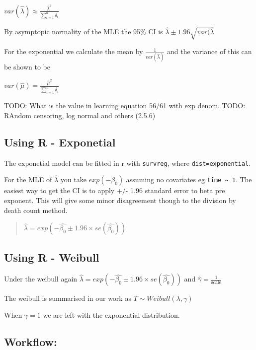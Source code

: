 \documentclass[
  letterpaper,
  DIV=11,
  numbers=noendperiod]{scrreprt}
\begin{document}
\(var(\hat{\lambda}) \approx \frac{\hat{\lambda}^2}{\sum^n_{i=1} \delta_i}\)

By asymptopic normality of the MLE the 95\% CI is
\(\hat{\lambda}\pm 1.96\sqrt{var(\hat{\lambda}}\)

For the exponential we calculate the mean by
\(\frac{1}{var(\hat{\lambda})}\) and the variance of this can be shown
to be

\(var(\hat{\mu}) = \frac{\hat{\mu}^2}{\sum_{i=1}^n \delta_i}\)

TODO: What is the value in learning equation 56/61 with exp denom. TODO:
RAndom censoring, log normal and others (2.5.6)

\hypertarget{using-r---exponetial}{%
\subsection{Using R - Exponetial}\label{using-r---exponetial}}

The exponetial model can be fitted in r with \texttt{survreg}, where
\texttt{dist=\textquotesingle{}exponential\textquotesingle{}}.

For the MLE of \(\hat{\lambda}\) you take \(exp(-\beta_0)\) assuming no
covariates eg \texttt{time\ \textasciitilde{}\ 1}. The easiest way to
get the CI is to apply +/- 1.96 standard error to beta pre exponent.
This will give some minor disagreement though to the division by death
count method.

\begin{quote}
\(\hat{\lambda} = exp(-\hat{\beta_0} \pm 1.96\times se(\hat{\beta_0}))\)
\end{quote}

\hypertarget{using-r---weibull}{%
\subsection{Using R - Weibull}\label{using-r---weibull}}

Under the weibull again
\(\hat{\lambda} = exp(-\hat{\beta_0} \pm 1.96\times se(\hat{\beta_0}))\)
and \(\hat{\gamma} = \frac{1}{\text{scale}}\)

The weibull is summarised in our work as
\(T \sim Weibull(\lambda, \gamma)\)

When \(\gamma = 1\) we are left with the exponential distribution.

\hypertarget{workflow-1}{%
\subsection{Workflow:}\label{workflow-1}}
\end{document}
